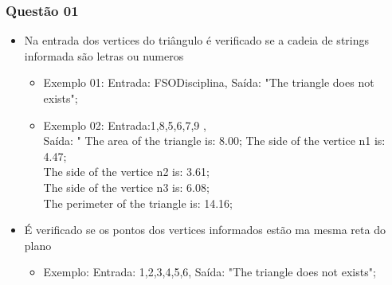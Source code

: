 \documentclass[11pt,a4paper]{article}
\begin{document}
\subsubsection{Questão 01}
\begin{itemize}
  \item Na entrada dos vertices do triângulo  é verificado se a cadeia de
  strings informada são letras ou numeros

  \begin{itemize}
    \item Exemplo 01: Entrada: FSODisciplina, Saída: "The triangle does not exists";
    \item Exemplo 02: Entrada:1,8,5,6,7,9 , \\
    Saída: " The area of the triangle is: 8.00; The side of the vertice n1 is: 4.47; \\
    The side of the vertice n2 is: 3.61;\\
    The side of the vertice n3 is: 6.08;\\
    The perimeter of the triangle is: 14.16;\\
  \end{itemize}

  \item É verificado se os pontos dos vertices informados estão ma mesma reta do plano
  \begin{itemize}
    \item Exemplo: Entrada: 1,2,3,4,5,6, Saída: "The triangle does not exists";
  \end{itemize}
\end{itemize}
\end{document}
